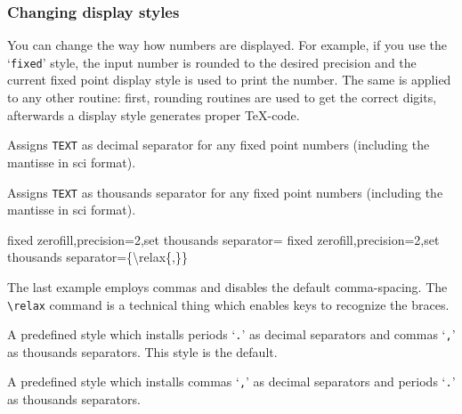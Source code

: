\subsubsection{Changing display styles}%
\label{sec:number:styles}%
You can change the way how numbers are displayed. For example, if you use the `\texttt{fixed}' style, the input number is rounded to the desired precision and the current fixed point display style is used to print the number. The same is applied to any other routine: first, rounding routines are used to get the correct digits, afterwards a display style generates proper \TeX-code.

\begin{description}
\def\examplenumbers{12.346}%
\item[\texttt{set decimal separator=TEXT}]
Assigns \texttt{TEXT} as decimal separator for any fixed point numbers (including the mantisse in sci format).

\item[\texttt{set thousands separator=TEXT}]
Assigns \texttt{TEXT} as thousands separator for any fixed point numbers (including the mantisse in sci format).

{%
\def\examplenumbers{1234.56,1234567890}%




\showexamplenumberswithFORMATTED
	{fixed zerofill,precision=2,set thousands separator={\relax{,}}}%
	{fixed zerofill,precision=2,set thousands separator=\{\textbackslash relax\{,\}\}}%
}%

The last example employs commas and disables the default comma-spacing. The \texttt{\textbackslash relax} command is a technical thing which enables \PGF keys to recognize the braces.

\item[\texttt{use period}] 
A predefined style which installs periods `\texttt{.}' as decimal separators and commas `\texttt{,}' as thousands separators. This style is the default.


\item[\texttt{use comma}] 
A predefined style which installs commas `\texttt{,}' as decimal separators and periods `\texttt{.}' as thousands separators.


\end{description}
